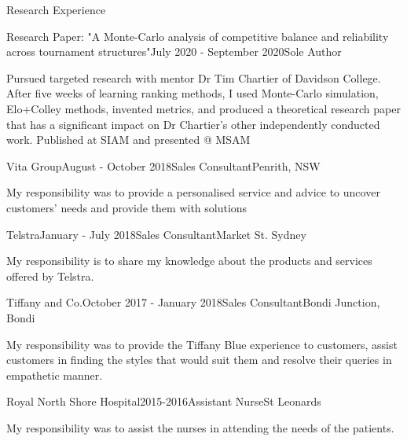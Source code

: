 \documentclass{resume} %
\begin{document}
\begin{rSection}{Research Experience}

\begin{rSubsection}{Research Paper:  "A Monte-Carlo analysis of competitive balance and reliability across tournament structures"}{July 2020 - September 2020}{Sole Author}
\item Pursued targeted research with  mentor Dr Tim Chartier of Davidson College. After five weeks of learning ranking methods, I used Monte-Carlo simulation, Elo+Colley methods, invented metrics, and produced a theoretical research paper that has a significant impact on Dr Chartier's other independently conducted work. Published at SIAM and presented @ MSAM

\end{rSubsection}


\begin{rSubsection}{Vita Group}{August - October 2018}{Sales Consultant}{Penrith, NSW}
\item My responsibility was to provide a personalised service and advice to uncover customers' needs and provide them with solutions
\end{rSubsection}


\begin{rSubsection}{Telstra}{January - July 2018}{Sales Consultant}{Market St. Sydney}
\item My responsibility is to share my knowledge about the products and services  offered by Telstra. 
\end{rSubsection}

\begin{rSubsection}{Tiffany and Co.}{October 2017 - January 2018}{Sales Consultant}{Bondi Junction, Bondi}
\item My responsibility was to provide the Tiffany Blue experience to customers, assist customers in finding the styles that would suit them and resolve their queries in empathetic manner.

\end{rSubsection}

\begin{rSubsection}{Royal North Shore Hospital}{2015-2016}{Assistant Nurse}{St Leonards}
\item My responsibility was to assist the nurses in attending the needs of the patients. 

\end{rSubsection}
\end{rSection}
\end{document}
